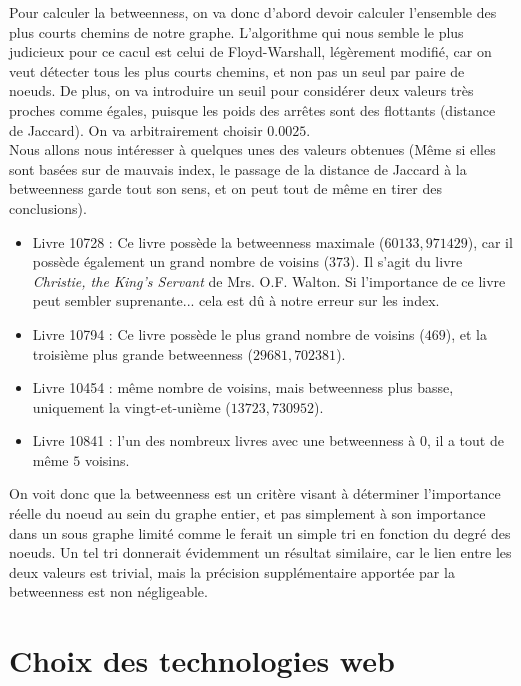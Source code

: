 \documentclass{article}
\begin{document}
Pour calculer la betweenness, on va donc d'abord devoir calculer l'ensemble des plus courts chemins de notre graphe. L'algorithme qui nous semble le plus judicieux pour ce cacul est celui de Floyd-Warshall, légèrement modifié, car on veut détecter tous les plus courts chemins, et non pas un seul par paire de noeuds. De plus, on va introduire un seuil pour considérer deux valeurs très proches comme égales, puisque les poids des arrêtes sont des flottants (distance de Jaccard). On va arbitrairement choisir $0.0025$.\\

Nous allons nous intéresser à quelques unes des valeurs obtenues (Même si elles sont basées sur de mauvais index, le passage de la distance de Jaccard à la betweenness garde tout son sens, et on peut tout de même en tirer des conclusions).\\

\begin{itemize}
\item Livre 10728 : Ce livre possède la betweenness maximale ($60133,971429$), car il possède également un grand nombre de voisins ($373$). Il s'agit du livre  \textit{Christie, the King's Servant} de Mrs. O.F. Walton. Si l'importance de ce livre peut sembler suprenante... cela est dû à notre erreur sur les index.
\item Livre 10794 : Ce livre possède le plus grand nombre de voisins ($469$), et la troisième plus grande betweenness ($29681,702381$).
\item Livre 10454 : même nombre de voisins, mais betweenness plus basse, uniquement la vingt-et-unième ($13723,730952$).
\item Livre 10841 : l'un des nombreux livres avec une betweenness à $0$, il a tout de même $5$ voisins.\\
\end{itemize}

On voit donc que la betweenness est un critère visant à déterminer l'importance réelle du noeud au sein du graphe entier, et pas simplement à son importance dans un sous graphe limité comme le ferait un simple tri en fonction du degré des noeuds. Un tel tri donnerait évidemment un résultat similaire, car le lien entre les deux valeurs est trivial, mais la précision supplémentaire apportée par la betweenness est non négligeable.

\section{Choix des technologies web}
\end{document}
